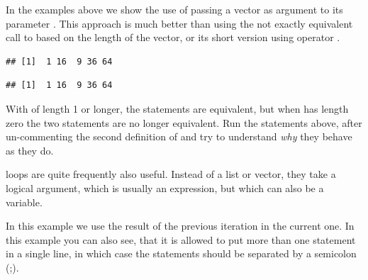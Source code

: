 \documentclass[krantz2]{krantz}\usepackage{knitr}%
\begin{document}
\begin{advplayground}
In the examples above we show the use of  passing a vector as argument to its parameter . This approach is much better than using the not exactly equivalent call to  based on the length of the vector, or its short version using operator \code{:}.

\begin{knitrout}\footnotesize
{}\color{fgcolor}\begin{kframe}
\begin{alltt}
 \hlkwb{<-} \hlstd{(}\hlstd{,} \hlstd{,} \hlstd{,} \hlstd{,} \hlstd{)}

 \hlkwb{<-} \hlstd{(}
  \hlstd{(} 
   \hlkwb{<-} \hlopt{^}
\hlstd{\}}
\end{alltt}
\begin{verbatim}
## [1]  1 16  9 36 64
\end{verbatim}
\begin{alltt}
 \hlkwb{<-} \hlstd{(}
  \hlopt{:}
   \hlkwb{<-} \hlopt{^}
\hlstd{\}}
\end{alltt}
\begin{verbatim}
## [1]  1 16  9 36 64
\end{verbatim}
\end{kframe}
\end{knitrout}

With  of length 1 or longer, the statements are equivalent, but when  has length zero the two statements are no longer equivalent. Run the statements above, after un-commenting the second definition of  and try to understand \emph{why} they behave as they do.
\end{advplayground}

 loops are quite frequently also useful. Instead of a list or vector, they take a logical argument, which is usually an expression, but which can also be a variable.

In this example we use the result of the previous iteration in the current one. In this example you can also see, that it is allowed to put more than one statement in a single line, in which case the statements should be separated by a semicolon (;).
\end{document}
